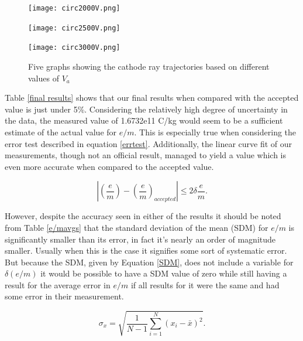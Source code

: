 \documentclass[prb,preprint]{revtex4-1}
\begin{document}
	\begin{figure}[h!]
		\begin{minipage}{.5\textwidth}
			\texttt{[image: circ2000V.png]}
		\end{minipage}%
		\begin{minipage}{.5\textwidth}
			\texttt{[image: circ2500V.png]}
		\end{minipage}
	\end{figure}
	\begin{figure}[h!]
		\begin{minipage}{.5\textwidth}
			\texttt{[image: circ3000V.png]}
		\end{minipage}
		\caption{Five graphs showing the cathode ray trajectories based on different values of $V_a$}
		\label{LSF:curvature}
	\end{figure}

\newpage

Table \ref{final results} shows that our final results when compared with the accepted value is just under 5\%. Considering the relatively high degree of uncertainty in the data, the measured value of 1.6732e11 C/kg would seem to be a sufficient estimate of the actual value for $e/m$. This is especially true when considering the error test described in equation \eqref{errtest}. Additionally, the linear curve fit of our measurements, though not an official result, managed to yield a value which is even more accurate when compared to the accepted value.

\begin{equation}\label{errtest}
\left|\left(\frac{e}{m}\right)-\left(\frac{e}{m}\right)_{accepted}\right|\leq2\delta\frac{e}{m}.
\end{equation}

However, despite the accuracy seen in either of the results it should be noted from Table \ref{e/mavgs} that the standard deviation of the mean (SDM) for $e/m$ is significantly smaller than its error, in fact it's nearly an order of magnitude smaller. Usually when this is the case it signifies some sort of systematic error. But because the SDM, given by Equation \eqref{SDM}, does not include a variable for $\delta (e/m)$ it would be possible to have a SDM value of zero while still having a result for the average error in $e/m$ if all results for it were the same and had some error in their measurement.

\begin{equation}\label{SDM}
\sigma_x = \sqrt{\frac{1}{N-1}\sum\limits_{i=1}^N (x_i-\bar{x})^2}.
\end{equation}
\end{document}
